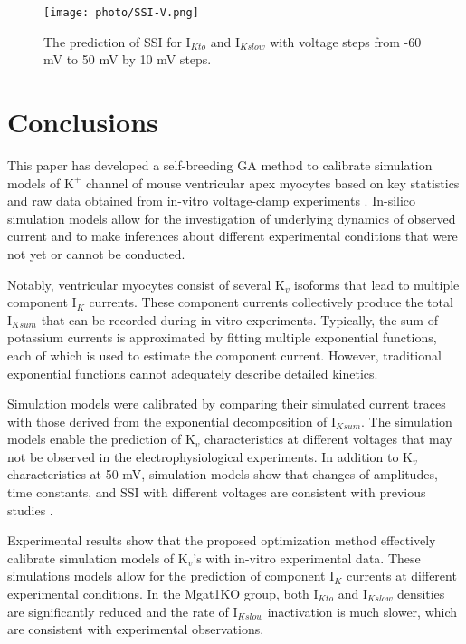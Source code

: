 \documentclass[journal]{IEEEtran}
\begin{document}
\begin{figure}
    \label{fig 10}
    \centering
    \texttt{[image: photo/SSI-V.png]}
    \caption{The prediction of SSI for $\text{I}_{Kto}$ and $\text{I}_{Kslow}$ with voltage steps from -60 mV to 50 mV by 10 mV steps.} 
\end{figure}

\section{Conclusions}
This paper has developed a self-breeding GA method to calibrate simulation models of $\text{K}^{+}$ channel of mouse ventricular apex myocytes based on key statistics and raw data obtained from in-vitro voltage-clamp experiments \cite{ednie2019reduced}. In-silico simulation models allow for the investigation of underlying dynamics of observed current and to make inferences about different experimental conditions that were not yet or cannot be conducted.

Notably, ventricular myocytes consist of several $\text{K}_{v}$ isoforms that lead to multiple component $\text{I}_{K}$ currents. These component currents collectively produce the total $\text{I}_{Ksum}$ that can be recorded during in-vitro experiments. Typically, the sum of potassium currents is approximated by fitting multiple exponential functions, each of which is used to estimate the component current. However, traditional exponential functions cannot adequately describe detailed kinetics.

Simulation models were calibrated by comparing their simulated current traces with those derived from the exponential decomposition of $\text{I}_{Ksum}$. The simulation models enable the prediction of $\text{K}_{v}$ characteristics at different voltages that may not be observed in the electrophysiological experiments. In addition to $\text{K}_{v}$ characteristics at 50 mV, simulation models show that changes of amplitudes, time constants, and SSI with different voltages are consistent with previous studies \cite{ednie2019reduced}.

Experimental results show that the proposed optimization method effectively calibrate simulation models of $\text{K}_{v}$'s with in-vitro experimental data. These simulations models allow for the prediction of component $\text{I}_{K}$ currents at different experimental conditions. In the Mgat1KO group, both $\text{I}_{Kto}$ and $\text{I}_{Kslow}$ densities are significantly reduced and the rate of $\text{I}_{Kslow}$ inactivation is much slower, which are consistent with experimental observations.
\end{document}

